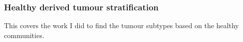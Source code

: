 \subsubsection{Healthy derived tumour stratification} \label{Sec:N_I:h_derived}

This covers the work I did to find the tumour subtypes based on the healthy communities.
